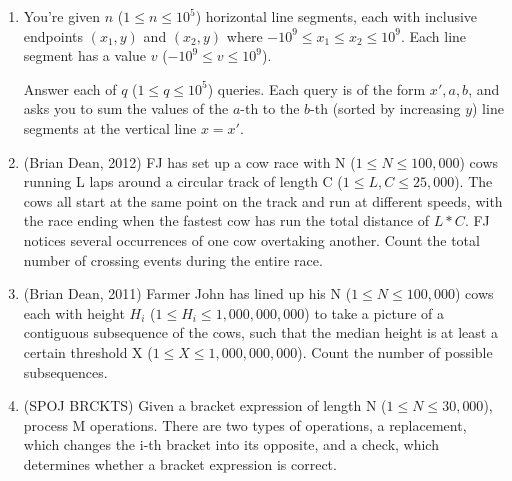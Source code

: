 \documentclass{article}
\begin{document}
\begin{enumerate}
    \item You're given $n$ ($1 \leq n \leq 10^5$) horizontal line segments, each with inclusive endpoints $(x_1, y)$ and $(x_2, y)$ where $-10^9 \leq x_1 \leq x_2 \leq 10^9$. Each line segment has a value $v$ ($-10^9 \leq v \leq 10^9$).

Answer each of $q$ ($1 \leq q \leq 10^5$) queries.
Each query is of the form $x', a, b$, and asks you to sum the values of the $a$-th to the $b$-th (sorted by increasing $y$) line segments at the vertical line $x = x'$.

    \item (Brian Dean, 2012) FJ has set up a cow race with N ($1 \leq N \leq 100,000$) cows running L laps around a circular
track of length C ($1 \leq L, C \leq 25,000$). The cows all start at the same point on the track and run at different
speeds, with the race ending when the fastest cow has run the total distance of $L * C$. FJ notices several
occurrences of one cow overtaking another. Count the total number of crossing events during the entire race.

    \item (Brian Dean, 2011) Farmer John has lined up his N ($1 \leq N \leq 100,000$) cows each with height $H_i$ ($1 \leq H_i \leq
1,000,000,000$) to take a picture of a contiguous subsequence of the cows, such that the median height is at
least a certain threshold X ($1 \leq X \leq 1,000,000,000$). Count the number of possible subsequences.

    \item (SPOJ BRCKTS) Given a bracket expression of length N ($1 \leq N \leq 30,000$), process M operations. There are
two types of operations, a replacement, which changes the i-th bracket into its opposite, and a check, which
determines whether a bracket expression is correct.
\end{enumerate} 
        
\end{document}
